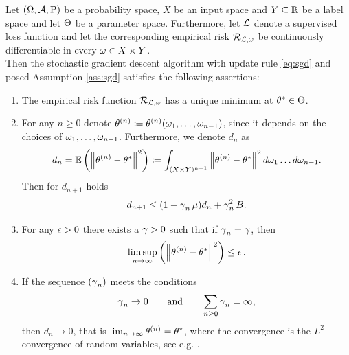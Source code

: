 \begin{theorem}\label{theorem:sgd}
Let $(\Omega, \operatorname{\mathcal{A}}, \operatorname{\text{P}})$ be a probability space, $X$ be an input space and $Y\subseteq \operatorname{\mathbb{R}}$ be a label space and let $\operatorname{\Theta}$ be a parameter space. Furthermore, let $\operatorname{\mathcal{L}}$ denote a supervised loss function and let the corresponding empirical risk $\operatorname{\mathcal{R}}_{\operatorname{\mathcal{L}}, \omega}$ be continuously differentiable in every $\omega\in X\times Y$.\\
Then the stochastic gradient descent algorithm with update rule \eqref{eq:sgd} and posed Assumption \ref{ass:sgd} satisfies the following assertions:
\begin{enumerate}
\item \label{ass1} The empirical risk function $\operatorname{\mathcal{R}}_{\operatorname{\mathcal{L}}, \omega}$ has a unique minimum at $\theta^{\ast}\in\operatorname{\Theta}$.
\item \label{ass2}For any $n\geq 0$ denote $\theta^{(n)}\coloneqq \theta^{(n)} (\omega_1,\ldots,\omega_{n-1})$, since it depends on the choices of $\omega_1,\ldots, \omega_{n-1}$. Furthermore, we denote $d_n$ as
\begin{align}\label{eq:dist}
d_n = \operatorname{\mathbb{E}} \left( \left\| \theta^{(n)} - \theta^{\ast} \right\|^2 \right) \coloneqq \int_{(X\times Y)^{n-1}} \left\| \theta^{(n)} - \theta^{\ast} \right\|^2d\omega_1\ldots d\omega_{n-1}.
\end{align}
Then for $d_{n+1}$ holds
\begin{align}\label{eq:dist_rec}
d_{n+1} \leq (1 - \operatorname{\gamma}_n\operatorname{\mu})d_n + \operatorname{\gamma}_n^2B.
\end{align}
\item \label{ass3}For any $\operatorname{\epsilon}>0$ there exists a $\operatorname{\gamma}>0$ such that if $\operatorname{\gamma}_n=\operatorname{\gamma}$, then
\begin{align}\label{eq:limsup}
\limsup_{n\to \infty} \left( \left\| \theta^{(n)} - \theta^{\ast} \right\|^2 \right) \leq \operatorname{\epsilon}.
\end{align}
\item \label{ass4} If the sequence $(\operatorname{\gamma}_n)$ meets the conditions
\begin{align}\label{eq:step_size}
\operatorname{\gamma}_n\to 0 \qquad \text{and} \qquad \sum_{n\geq 0} \operatorname{\gamma}_n = \infty,
\end{align}
then $d_n\to 0$, that is $\lim_{n\to\infty}\theta^{(n)} = \theta^{\ast}$, where the convergence is the $L^2$-convergence of random variables, see e.g. \cite[Chapter~7]{klenke2013probability}.
\end{enumerate}
\end{theorem}

